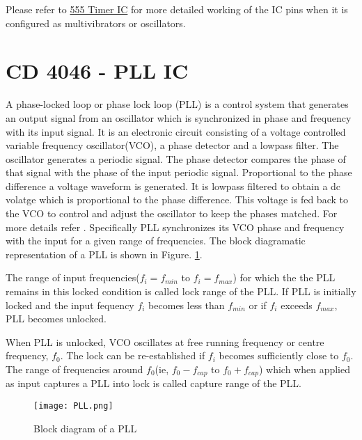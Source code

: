 Please refer to \href{https://en.wikipedia.org/wiki/555_timer_IC}{555 Timer IC} for more detailed working of the IC pins when it is configured as multivibrators or oscillators.

%
%


\section{CD 4046 - PLL IC}
\label{4046}
A phase-locked loop or phase lock loop (PLL) is a control system that generates an output signal from an oscillator which is synchronized in phase and frequency with its input signal. It is an electronic circuit consisting of a voltage controlled variable frequency oscillator(VCO), a phase detector and a lowpass filter. The oscillator generates a periodic signal. The phase detector compares the phase of that signal with the phase of the input periodic signal. Proportional to the phase difference a voltage waveform is generated. It is lowpass filtered to obtain a dc volatge which is proportional to the phase difference. This voltage is fed back to the VCO to control and adjust the oscillator to keep the phases matched. For more details refer \cite{wikipll}. Specifically PLL synchronizes its VCO phase and frequency with the input for a given range of frequencies. The block diagramatic representation of a PLL is shown in Figure. \ref{pll}.

The range of input frequencies($f_i=f_{min}$ to $f_i=f_{max}$) for which the the PLL remains in this locked condition is called lock range of the PLL. If PLL is initially locked and the input fequency $f_i$ becomes less than $f_{min}$ or if $f_i$ exceeds $f_{max}$, PLL becomes unlocked. 

When PLL is unlocked, VCO oscillates at free running frequency or centre frequency, $f_0$. The lock can be re-established if $f_i$ becomes sufficiently close to $f_0$. The range of frequencies around $f_0$(ie, $f_0-f_{cap}$ to $f_0+f_{cap}$) which when applied as input captures a PLL into lock is called capture range of the PLL.

\begin{figure}
\texttt{[image: PLL.png]}
\caption{Block diagram of a PLL}
\label{pll}
\end{figure}

